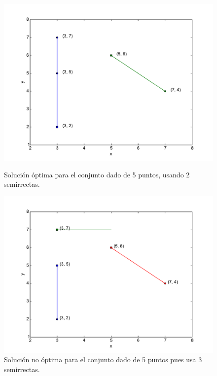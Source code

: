 \begin{figure}[H]
\centering
\begin{minipage}{0.49\textwidth}
  \centering
    \includegraphics[width=1\textwidth]{img/ejemplos/ej3-1.pdf}
  \caption{\footnotesize Solución óptima para el conjunto dado de 5 puntos, usando 2 semirrectas.}
  \label{fig:ej3-1}
\end{minipage}%
\hspace{0.01\textwidth}
\begin{minipage}{0.49\textwidth}   
  \centering
    \includegraphics[width=1\textwidth]{img/ejemplos/ej3-2.pdf} 
  \caption{\footnotesize Solución no óptima para el conjunto dado de 5 puntos pues usa 3 semirrectas.}
  \label{fig:ej3-2}
\end{minipage}%
\end{figure}

